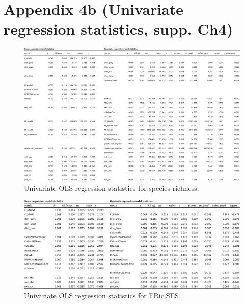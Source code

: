 \chapter[Appendix 4b (Univariate regression statistics, supp. Ch4)]{Appendix 4b (Univariate regression statistics, supp. Ch4)}

\begin{landscape}
\begin{figure}[h!]
\begin{center}
\includegraphics[width=20cm]{regression_stats_sprichChao1.pdf} %
\caption[Univariate OLS regression statistics for species richness.]{\small{Univariate OLS regression statistics for species richness.}} %
\label{fig:Ch4sup2_F1} %
\end{center}
\end{figure}   
\end{landscape}
\clearpage

\begin{landscape}
\begin{figure}[h!]
\begin{center}
\includegraphics[width=20cm]{S2b.pdf} %
\caption[Univariate OLS regression statistics for FRic.SES.]{\small{Univariate OLS regression statistics for FRic.SES.}} %
\label{fig:Ch4sup2_F1} %
\end{center}
\end{figure}   
\end{landscape}
\clearpage

